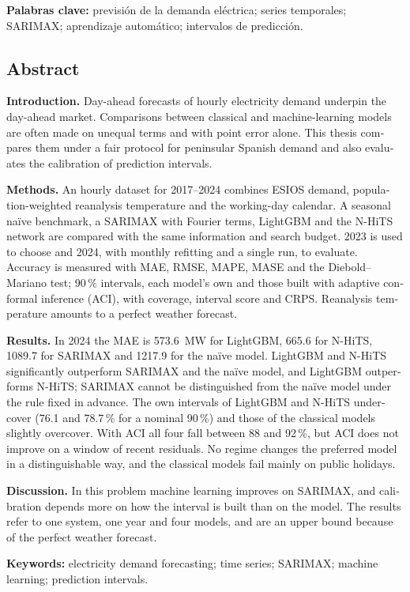 \medskip
\noindent\textbf{Palabras clave:} previsión de la demanda eléctrica; series
temporales; SARIMAX; aprendizaje automático; intervalos de predicción.

\clearpage
\begin{otherlanguage}{english}
\chapter*{Abstract}

\textbf{Introduction.} Day-ahead forecasts of hourly electricity demand underpin
the day-ahead market. Comparisons between classical and machine-learning models
are often made on unequal terms and with point error alone. This thesis compares
them under a fair protocol for peninsular Spanish demand and also evaluates the
calibration of prediction intervals.

\textbf{Methods.} An hourly dataset for 2017--2024 combines ESIOS demand,
population-weighted reanalysis temperature and the working-day calendar. A
seasonal naïve benchmark, a SARIMAX with Fourier terms, LightGBM and the N-HiTS
network are compared with the same information and search budget. 2023 is used to
choose and 2024, with monthly refitting and a single run, to evaluate. Accuracy is
measured with MAE, RMSE, MAPE, MASE and the Diebold--Mariano test; 90\,\%
intervals, each model's own and those built with adaptive conformal inference
(ACI), with coverage, interval score and CRPS. Reanalysis temperature amounts to
a perfect weather forecast.

\textbf{Results.} In 2024 the MAE is 573.6~MW for LightGBM, 665.6 for N-HiTS,
1089.7 for SARIMAX and 1217.9 for the naïve model. LightGBM and N-HiTS
significantly outperform SARIMAX and the naïve model, and LightGBM outperforms
N-HiTS; SARIMAX cannot be distinguished from the naïve model under the rule fixed
in advance. The own intervals of LightGBM and N-HiTS undercover (76.1 and
78.7\,\% for a nominal 90\,\%) and those of the classical models slightly
overcover. With ACI all four fall between 88 and 92\,\%, but ACI does not improve
on a window of recent residuals. No regime changes the preferred model in a
distinguishable way, and the classical models fail mainly on public holidays.

\textbf{Discussion.} In this problem machine learning improves on SARIMAX, and
calibration depends more on how the interval is built than on the model. The
results refer to one system, one year and four models, and are an upper bound
because of the perfect weather forecast.

\medskip
\noindent\textbf{Keywords:} electricity demand forecasting; time series; SARIMAX;
machine learning; prediction intervals.
\end{otherlanguage}
